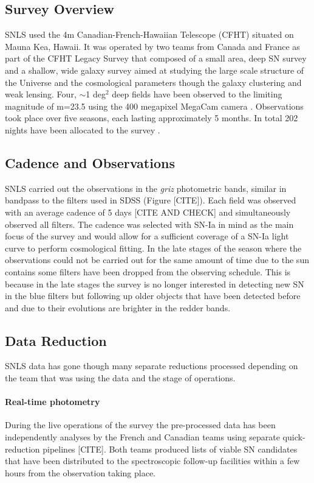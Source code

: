 \subsection{Survey Overview}
SNLS used the 4m Canadian-French-Hawaiian Telescope (CFHT) situated on Mauna Kea, Hawaii. It was operated by two teams from Canada and France as part of the CFHT Legacy Survey that composed of a small area, deep SN survey and a shallow, wide galaxy survey aimed at studying the large scale structure of the Universe and the cosmological parameters though the galaxy clustering and weak lensing. Four, $\sim$1 deg$^2$ deep fields have been observed to the limiting magnitude of m=23.5 using the 400 megapixel MegaCam camera \citep{Boulade2003MegaCam:Camera}. Observations took place over five seasons, each lasting approximately 5 months. In total 202 nights have been allocated to the survey \citep{Pritchet2004SNLSSurvey}.

\subsection{Cadence and Observations}
SNLS carried out the observations in the \textit{griz} photometric bands, similar in bandpass to the filters used in SDSS (Figure [CITE]). Each field was observed with an average cadence of 5 days [CITE AND CHECK] and simultaneously observed all filters. The cadence was selected with SN-Ia in mind as the main focus of the survey and would allow for a sufficient coverage of a SN-Ia light curve to perform cosmological fitting. In the late stages of the season where the observations could not be carried out for the same amount of time due to the sun contains some filters have been dropped from the observing schedule. This is because in the late stages the survey is no longer interested in detecting new SN in the blue filters but following up older objects that have been detected before and due to their evolutions are brighter in the redder bands. 

\subsection{Data Reduction}
SNLS data has gone though many separate reductions processed depending on the team that was using the data and the stage of operations. 

\paragraph{Real-time photometry}
During the live operations of the survey the pre-processed data has been independently analyses by the French and Canadian teams using separate quick-reduction pipelines [CITE]. Both teams produced lists of viable SN candidates that have been distributed to the spectroscopic follow-up facilities within a few hours from the observation taking place. 

